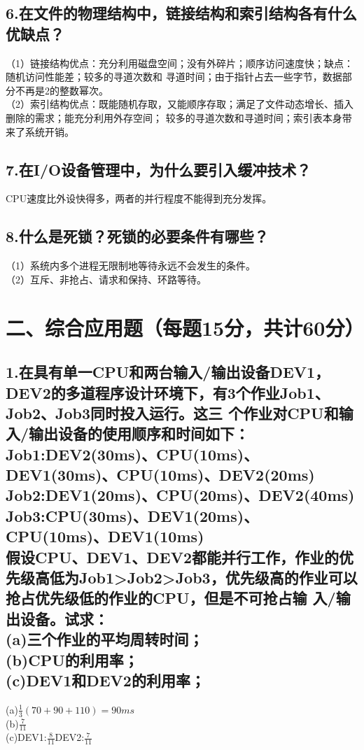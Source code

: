 \documentclass[UTF8]{ctexart}
\begin{document}
\subsection*{6.在文件的物理结构中，链接结构和索引结构各有什么优缺点？}
（1）链接结构优点：充分利用磁盘空间；没有外碎片；顺序访问速度快；缺点：随机访问性能差；较多的寻道次数和
寻道时间；由于指针占去一些字节，数据部分不再是2的整数幂次。\\
（2）索引结构优点：既能随机存取，又能顺序存取；满足了文件动态增长、插入删除的需求；能充分利用外存空间；
较多的寻道次数和寻道时间；索引表本身带来了系统开销。\\
\subsection*{7.在I/O设备管理中，为什么要引入缓冲技术？}
CPU速度比外设快得多，两者的并行程度不能得到充分发挥。\\
\subsection*{8.什么是死锁？死锁的必要条件有哪些？}
（1）系统内多个进程无限制地等待永远不会发生的条件。\\
（2）互斥、非抢占、请求和保持、环路等待。\\
\section*{二、综合应用题（每题15分，共计60分）}
\subsection*{1.在具有单一CPU和两台输入/输出设备DEV1，DEV2的多道程序设计环境下，有3个作业Job1、Job2、Job3同时投入运行。这三
个作业对CPU和输入/输出设备的使用顺序和时间如下：\\
Job1:DEV2(30ms)、CPU(10ms)、DEV1(30ms)、CPU(10ms)、DEV2(20ms)\\
Job2:DEV1(20ms)、CPU(20ms)、DEV2(40ms)\\
Job3:CPU(30ms)、DEV1(20ms)、CPU(10ms)、DEV1(10ms)\\
假设CPU、DEV1、DEV2都能并行工作，作业的优先级高低为Job1>Job2>Job3，优先级高的作业可以抢占优先级低的作业的CPU，但是不可抢占输
入/输出设备。试求：\\
(a)三个作业的平均周转时间；\\
(b)CPU的利用率；\\
(c)DEV1和DEV2的利用率；\\
}
(a)$\frac{1}{3}(70+90+110)=90ms$\\
(b)$\frac{7}{11}$\\
(c)DEV1:$\frac{8}{11}$DEV2:$\frac{7}{11}$\\
\end{document}
